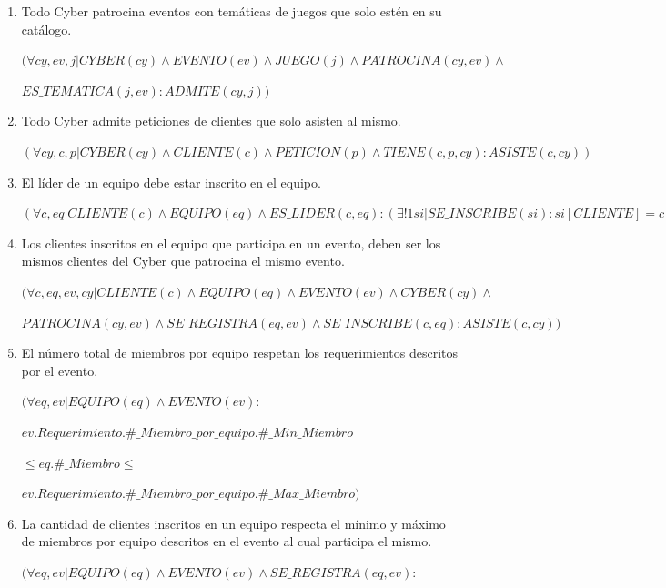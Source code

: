 \documentclass[a4paper,12pt]{article}
\begin{document}
\begin{itemize}
\begin{enumerate}
$(\forall eq, ev | EQUIPO(eq) \land EVENTO(ev) \land SE\_REGISTRA(eq, ev)\land$

$ev.Requerimiento.Traje\_de\_Equipo = TRUE: eq.Personalizacion.Traje \neq NULL)$ 
   
\item Todo Cyber patrocina eventos con temáticas de juegos que solo estén en su catálogo.

$(\forall cy, ev, j | CYBER(cy) \land EVENTO(ev) \land JUEGO(j) \land PATROCINA(cy, ev)\land$

$ES\_TEMATICA(j, ev): ADMITE(cy, j))$
   
\item Todo Cyber admite peticiones de clientes que solo asisten al mismo.

$(\forall cy,c,p|CYBER(cy)\land CLIENTE(c)\land PETICION(p)\land TIENE(c,p,cy): ASISTE(c, cy))$
   
\item El líder de un equipo debe estar inscrito en el equipo.

$(\forall c, eq | CLIENTE(c) \land EQUIPO(eq) \land ES\_LIDER(c, eq): (\exists!1 si | SE\_INSCRIBE(si) : si[CLIENTE] = c \land si[EQUIPO] = eq))$

\item Los clientes inscritos en el equipo que participa en un evento, deben ser los mismos clientes del Cyber que patrocina el mismo evento.

$(\forall c, eq, ev, cy | CLIENTE(c) \land EQUIPO(eq) \land EVENTO(ev) \land CYBER(cy)\land$

$PATROCINA(cy, ev) \land SE\_REGISTRA(eq, ev) \land SE\_INSCRIBE(c, eq): ASISTE(c, cy))$
    
\item El número total de miembros por equipo respetan los requerimientos descritos por el evento.

$(\forall eq, ev | EQUIPO(eq) \land EVENTO(ev):$

$ev.Requerimiento.\#\_Miembro\_por\_equipo.\#\_Min\_Miembro$

$\leq eq.\#\_Miembro \leq$

$ev.Requerimiento.\#\_Miembro\_por\_equipo.\#\_Max\_Miembro)$
    
\item La cantidad de clientes inscritos en un equipo respecta el mínimo y máximo de miembros por equipo descritos en el evento al cual participa el mismo.

$(\forall eq,ev | EQUIPO(eq) \land EVENTO(ev) \land SE\_REGISTRA(eq, ev):$


\end{enumerate}
\end{itemize}
\end{document}
